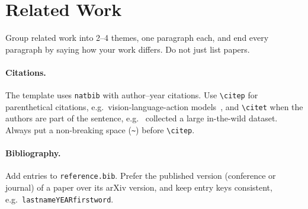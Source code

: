 \section{Related Work}
\label{sec:related}

Group related work into 2--4 themes, one paragraph each, and end every paragraph by saying how your work differs. Do not just list papers.

\paragraph{Citations.} The template uses \texttt{natbib} with author--year citations. Use \verb|\citep| for parenthetical citations, e.g.\ vision-language-action models~\citep{kim2024openvla,black2410pi0}, and \verb|\citet| when the authors are part of the sentence, e.g.\ \citet{khazatsky2024droid} collected a large in-the-wild dataset. Always put a non-breaking space (\verb|~|) before \verb|\citep|.

\paragraph{Bibliography.} Add entries to \texttt{reference.bib}. Prefer the published version (conference or journal) of a paper over its arXiv version, and keep entry keys consistent, e.g.\ \texttt{lastnameYEARfirstword}.
